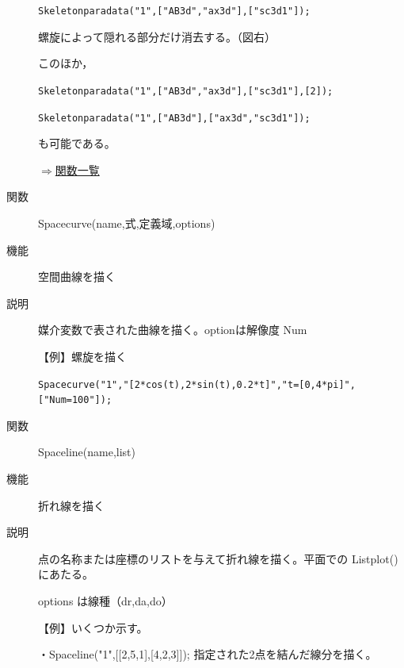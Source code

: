 \documentclass[papersize,a4paper,12pt,uplatex]{jsarticle}
\begin{document}
\begin{description}
\hspace{10mm} \verb|Skeletonparadata("1",["AB3d","ax3d"],["sc3d1"]);|
  
螺旋によって隠れる部分だけ消去する。（図右）

\begin{center}     
  \end{center}

このほか，

\hspace{10mm} \verb|Skeletonparadata("1",["AB3d","ax3d"],["sc3d1"],[2]);|

\hspace{10mm} \verb|Skeletonparadata("1",["AB3d"],["ax3d","sc3d1"]);|

も可能である。

\begin{flushright} \hyperlink{functionlist}{$\Rightarrow$関数一覧}\end{flushright}
\vspace{\baselineskip}

\hypertarget{spacecurve}{}
\item[関数]  Spacecurve(name,式,定義域,options)
\item[機能]  空間曲線を描く
\item[説明]  媒介変数で表された曲線を描く。optionは解像度 Num

\vspace{\baselineskip}
【例】螺旋を描く

\verb|Spacecurve("1","[2*cos(t),2*sin(t),0.2*t]","t=[0,4*pi]",["Num=100"]);|
    
\vspace{\baselineskip}
 \begin{center}  \end{center}

\hypertarget{spaceline}{}
\item[関数]  Spaceline(name,list)
\item[機能]  折れ線を描く
\item[説明]  点の名称または座標のリストを与えて折れ線を描く。平面での Listplot() にあたる。

options は線種（dr,da,do）

\vspace{\baselineskip}
【例】いくつか示す。

・Spaceline("1",[[2,5,1],[4,2,3]]);   指定された2点を結んだ線分を描く。


\end{description}
\end{document}
